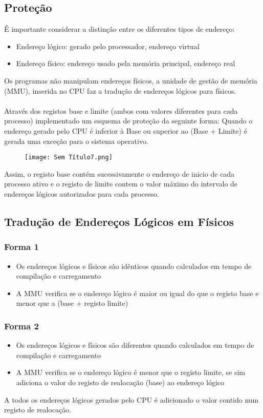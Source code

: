 \documentclass[10pt,a4paper]{report}
\begin{document}
\subsection{Proteção}
É importante considerar a distinção entre os diferentes tipos de endereço:
\begin{itemize}
\item Endereço lógico: gerado pelo processador, endereço virtual
\item Endereço físico: endereço usado pela memória principal, endereço real
\end{itemize}
Os programas não manipulam endereços físicos, a unidade de gestão de memória (MMU), inserida no CPU faz a tradução de endereços lógicos para físicos.\\
\\
Através dos registos base e limite (ambos com valores diferentes para cada processo) implementado um esquema de proteção da seguinte forma: Quando o endereço gerado pelo CPU é inferior à Base ou superior ao (Base + Limite) é gerada uma exceção para o sistema operativo.
\begin{figure}[H]
\centering
\texttt{[image: Sem Título7.png]}
\end{figure}
Assim, o registo base contém sucessivamente o endereço de inicio de cada processo ativo e o registo de limite contem o valor máximo do intervalo de endereços lógicos autorizados para cada processo.
\subsection{Tradução de Endereços Lógicos em Físicos}
\subsubsection{Forma 1}
\begin{itemize}
\item Os endereços lógicos e físicos são idênticos quando calculados em tempo de compilação e carregamento
\item A MMU verifica se o endereço lógico é maior ou igual do que o registo base e menor que a (base + registo limite)
\end{itemize}
\subsubsection{Forma 2}
\begin{itemize}
\item Os endereços lógicos e físicos são diferentes quando calculados em tempo de compilação e carregamento
\item A MMU verifica se o endereço lógico é menor que o registo limite, se sim adiciona o valor do registo de realocação (base) ao endereço lógico
\end{itemize}
A todos os endereços lógicos gerados pelo CPU é adicionado o valor contido num registo de realocação.
\end{document}
